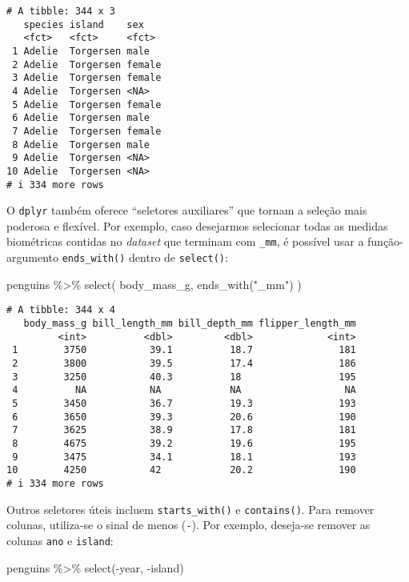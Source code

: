 \documentclass[
  12pt,
  letterpaper,
  DIV=11,
  numbers=noendperiod]{scrreprt}
\newenvironment{Shaded}{\begin{snugshade}}{\end{snugshade}}
\newcommand{\FunctionTok}[1]{\textcolor[rgb]{0.28,0.35,0.67}{#1}}
\newcommand{\NormalTok}[1]{\textcolor[rgb]{0.00,0.23,0.31}{#1}}
\newcommand{\SpecialCharTok}[1]{\textcolor[rgb]{0.37,0.37,0.37}{#1}}
\newcommand{\StringTok}[1]{\textcolor[rgb]{0.13,0.47,0.30}{#1}}
\begin{document}
\begin{verbatim}
# A tibble: 344 x 3
   species island    sex   
   <fct>   <fct>     <fct> 
 1 Adelie  Torgersen male  
 2 Adelie  Torgersen female
 3 Adelie  Torgersen female
 4 Adelie  Torgersen <NA>  
 5 Adelie  Torgersen female
 6 Adelie  Torgersen male  
 7 Adelie  Torgersen female
 8 Adelie  Torgersen male  
 9 Adelie  Torgersen <NA>  
10 Adelie  Torgersen <NA>  
# i 334 more rows
\end{verbatim}

\noindent O \texttt{dplyr} também oferece ``seletores auxiliares'' que
tornam a seleção mais poderosa e flexível. Por exemplo, caso desejarmos
selecionar todas as medidas biométricas contidas no \emph{dataset} que
terminam com \texttt{\_mm}, é possível usar a função-argumento
\texttt{ends\_with()} dentro de \texttt{select()}:

\begin{Shaded}
\begin{Highlighting}[]
\NormalTok{penguins }\SpecialCharTok{\%\textgreater{}\%} 
  \FunctionTok{select}\NormalTok{(}
\NormalTok{    body\_mass\_g, }\FunctionTok{ends\_with}\NormalTok{(}\StringTok{"\_mm"}\NormalTok{)}
\NormalTok{  )}
\end{Highlighting}
\end{Shaded}

\begin{verbatim}
# A tibble: 344 x 4
   body_mass_g bill_length_mm bill_depth_mm flipper_length_mm
         <int>          <dbl>         <dbl>             <int>
 1        3750           39.1          18.7               181
 2        3800           39.5          17.4               186
 3        3250           40.3          18                 195
 4          NA           NA            NA                  NA
 5        3450           36.7          19.3               193
 6        3650           39.3          20.6               190
 7        3625           38.9          17.8               181
 8        4675           39.2          19.6               195
 9        3475           34.1          18.1               193
10        4250           42            20.2               190
# i 334 more rows
\end{verbatim}

\noindent Outros seletores úteis incluem \texttt{starts\_with()} e
\texttt{contains()}. Para remover colunas, utiliza-se o sinal de menos
(\texttt{-}). Por exemplo, deseja-se remover as colunas \texttt{ano} e
\texttt{island}:

\begin{Shaded}
\begin{Highlighting}[]
\NormalTok{penguins }\SpecialCharTok{\%\textgreater{}\%} 
  \FunctionTok{select}\NormalTok{(}\SpecialCharTok{{-}}\NormalTok{year, }\SpecialCharTok{{-}}\NormalTok{island)}
\end{Highlighting}
\end{Shaded}
\end{document}
